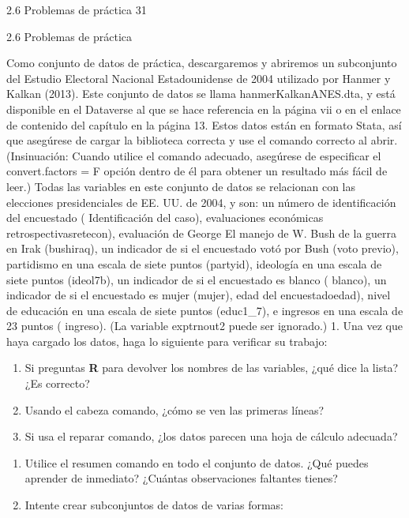 \documentclass[
]{book}
\providecommand{\tightlist}{%
  \setlength{\itemsep}{0pt}\setlength{\parskip}{0pt}}
\begin{document}
2.6 Problemas de práctica 31

2.6 Problemas de práctica

Como conjunto de datos de práctica, descargaremos y abriremos un subconjunto del Estudio Electoral Nacional Estadounidense de 2004 utilizado por Hanmer y Kalkan (2013). Este conjunto de datos se llama hanmerKalkanANES.dta, y está disponible en el Dataverse al que se hace referencia en la página vii o en el enlace de contenido del capítulo en la página 13. Estos datos están en formato Stata, así que asegúrese de cargar la biblioteca correcta y use el comando correcto al abrir. (Insinuación:
Cuando utilice el comando adecuado, asegúrese de especificar el convert.factors = F
opción dentro de él para obtener un resultado más fácil de leer.) Todas las variables en este conjunto de datos se relacionan con las elecciones presidenciales de EE. UU. de 2004, y son: un número de identificación del encuestado ( Identificación del caso), evaluaciones económicas retrospectivasretecon), evaluación de George
El manejo de W. Bush de la guerra en Irak (bushiraq), un indicador de si el encuestado votó por Bush (voto previo), partidismo en una escala de siete puntos (partyid), ideología en una escala de siete puntos (ideol7b), un indicador de si el encuestado es blanco ( blanco), un indicador de si el encuestado es mujer (mujer), edad del encuestadoedad), nivel de educación en una escala de siete puntos (educ1\_7), e ingresos en una escala de 23 puntos ( ingreso). (La variable exptrnout2 puede ser ignorado.)
1. Una vez que haya cargado los datos, haga lo siguiente para verificar su trabajo:

\begin{enumerate}
\def\labelenumi{(\alph{enumi})}
\tightlist
\item
  Si preguntas \textbf{R} para devolver los nombres de las variables, ¿qué dice la lista? ¿Es correcto?
\item
  Usando el cabeza comando, ¿cómo se ven las primeras líneas?
\item
  Si usa el reparar comando, ¿los datos parecen una hoja de cálculo adecuada?
\end{enumerate}

\begin{enumerate}
\def\labelenumi{\arabic{enumi}.}
\setcounter{enumi}{1}
\tightlist
\item
  Utilice el resumen comando en todo el conjunto de datos. ¿Qué puedes aprender de inmediato? ¿Cuántas observaciones faltantes tienes?
\item
  Intente crear subconjuntos de datos de varias formas:
\end{enumerate}
\end{document}
